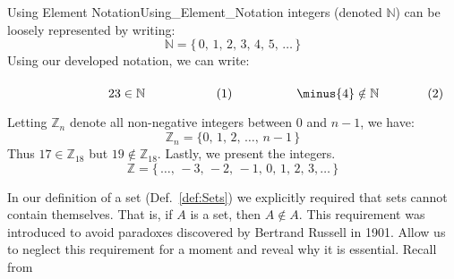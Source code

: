 \begin{fexample}{Using Element Notation}{Using_Element_Notation}
        integers (denoted $\mathbb{N}$) can be loosely represented by writing:
        \begin{equation}
            \label{eqn:Natural_Numbers_Ellipses}%
            \mathbb{N}=\big\{\,0,\,1,\,2,\,3,\,4,\,5,\,\dots\,\big\}
        \end{equation}
        Using our developed notation, we can write:
        \par\hfill\par
        \begin{subequations}
            \begin{minipage}[b]{0.49\textwidth}
                \begin{equation}
                    23\in\mathbb{N}
                \end{equation}
            \end{minipage}
            \hfill
            \begin{minipage}[b]{0.49\textwidth}
                \begin{equation}
                    \minus{4}\notin\mathbb{N}
                \end{equation}
            \end{minipage}
        \end{subequations}
        \par\vspace{2.5ex}
        Letting $\mathbb{Z}_{n}$ denote all non-negative integers between 0 and
        $n-1$, we have:
        \begin{equation}
            \label{eqn:Z_n_Ellipses}%
            \mathbb{Z}_{n}=\big\{0,\,1,\,2,\,\dots,\,n-1\,\big\}
        \end{equation}
        Thus $17\in\mathbb{Z}_{18}$ but $19\notin\mathbb{Z}_{18}$. Lastly, we
        present the integers.
        \begin{equation}
            \label{eqn:Integers_Ellipses}%
            \mathbb{Z}=\big\{\,\dots,\,\minus{3},\,\minus{2},\,\minus{1},
                             \,0,\,1,\,2,\,3,\dots\,\big\}
        \end{equation}
    \end{fexample}
    In our definition of a set (Def.~\ref{def:Sets}) we explicitly required
    that sets cannot contain themselves. That is, if $A$ is a set, then
    $A\notin{A}$. This requirement was introduced to avoid paradoxes discovered
    by Bertrand Russell in 1901. Allow us to neglect
    this requirement for a moment and reveal why it is essential. Recall from
